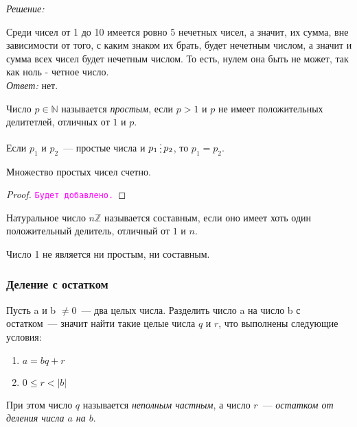 \documentclass[11pt]{article}
\begin{document}
\textit{Решение:}

Среди чисел от 1 до 10 имеется ровно 5 нечетных чисел, а значит, их сумма, вне зависимости от того, с каким знаком их брать, будет нечетным числом, а значит и сумма всех чисел будет нечетным числом. То есть, нулем она быть не может, так как ноль - четное число.\\

\textit{Ответ:} нет.

\begin{definition}
    Число $p \in \mathbb{N}$ называется \emph{простым}, если $p > 1$ и $p$ не имеет положительных делитетлей, отличных от $1$ и $p$.
\end{definition}

\begin{statement}
	Если $p_1$ и $p_2$~--- простые числа и $p_1 \divisible p_2$, то $p_1 = p_2$.
\end{statement}

\begin{theorem}[Евклид]

    Множество простых чисел счетно.

\end{theorem}

\begin{proof}
	\textcolor{magenta}{\texttt{Будет добавлено.}}

\end{proof}

\begin{definition}

	Натуральное число $n \mathbb{Z}$ называется составным, если оно имеет хоть один положительный делитель, отличный от $1$ и $n$.

\end{definition}

\begin{remark}

	Число 1 не является ни простым, ни составным.

\end{remark}

\subsubsection{Деление с остатком}

\begin{definition}
    Пусть a и b $\neq 0$~--- два целых числа. Разделить число  a на число b с остатком~--- значит найти такие целые числа $q$ и $r$, что выполнены следующие условия:

	\begin{enumerate}

	    \item $a = bq + r$

		\item $0 \le r < |b|$

	\end{enumerate}

	При этом число $q$ называется \emph{неполным частным}, а число $r$~--- \emph{остатком от деления числа $a$ на $b$}.

\end{definition}
\end{document}
